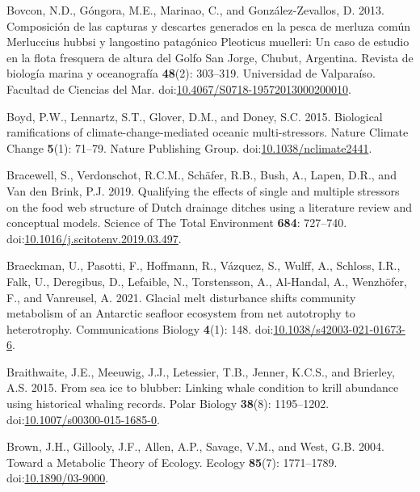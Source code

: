 \documentclass[
]{article}
\newlength{\cslhangindent}
\newenvironment{CSLReferences}[2] %
 {\begin{list}{}{%
  \setlength{\itemindent}{0pt}
  \setlength{\leftmargin}{0pt}
  \setlength{\parsep}{0pt}
  \ifodd #1
   \setlength{\leftmargin}{\cslhangindent}
   \setlength{\itemindent}{-1\cslhangindent}
  \fi
  \setlength{\itemsep}{#2\baselineskip}}}
 {\end{list}}
\begin{document}
\begin{CSLReferences}{1}{0}
Bovcon, N.D., Góngora, M.E., Marinao, C., and González-Zevallos, D.
2013. Composici{ó}n de las capturas y descartes generados en la pesca de
merluza com{ú}n {Merluccius} hubbsi y langostino patag{ó}nico
{Pleoticus} muelleri: Un caso de estudio en la flota fresquera de altura
del {Golfo San Jorge}, {Chubut}, {Argentina}. Revista de biolog{í}a
marina y oceanograf{í}a \textbf{48}(2): 303--319. Universidad de
Valpara{í}so. Facultad de Ciencias del Mar.
doi:\href{https://doi.org/10.4067/S0718-19572013000200010}{10.4067/S0718-19572013000200010}.

Boyd, P.W., Lennartz, S.T., Glover, D.M., and Doney, S.C. 2015.
Biological ramifications of climate-change-mediated oceanic
multi-stressors. Nature Climate Change \textbf{5}(1): 71--79. Nature
Publishing Group.
doi:\href{https://doi.org/10.1038/nclimate2441}{10.1038/nclimate2441}.

Bracewell, S., Verdonschot, R.C.M., Schäfer, R.B., Bush, A., Lapen,
D.R., and Van den Brink, P.J. 2019. Qualifying the effects of single and
multiple stressors on the food web structure of {Dutch} drainage ditches
using a literature review and conceptual models. Science of The Total
Environment \textbf{684}: 727--740.
doi:\href{https://doi.org/10.1016/j.scitotenv.2019.03.497}{10.1016/j.scitotenv.2019.03.497}.

Braeckman, U., Pasotti, F., Hoffmann, R., Vázquez, S., Wulff, A.,
Schloss, I.R., Falk, U., Deregibus, D., Lefaible, N., Torstensson, A.,
Al-Handal, A., Wenzhöfer, F., and Vanreusel, A. 2021. Glacial melt
disturbance shifts community metabolism of an {Antarctic} seafloor
ecosystem from net autotrophy to heterotrophy. Communications Biology
\textbf{4}(1): 148.
doi:\href{https://doi.org/10.1038/s42003-021-01673-6}{10.1038/s42003-021-01673-6}.

Braithwaite, J.E., Meeuwig, J.J., Letessier, T.B., Jenner, K.C.S., and
Brierley, A.S. 2015. From sea ice to blubber: Linking whale condition to
krill abundance using historical whaling records. Polar Biology
\textbf{38}(8): 1195--1202.
doi:\href{https://doi.org/10.1007/s00300-015-1685-0}{10.1007/s00300-015-1685-0}.

Brown, J.H., Gillooly, J.F., Allen, A.P., Savage, V.M., and West, G.B.
2004. Toward a {Metabolic Theory} of {Ecology}. Ecology \textbf{85}(7):
1771--1789. doi:\href{https://doi.org/10.1890/03-9000}{10.1890/03-9000}.


\end{CSLReferences}
\end{document}
